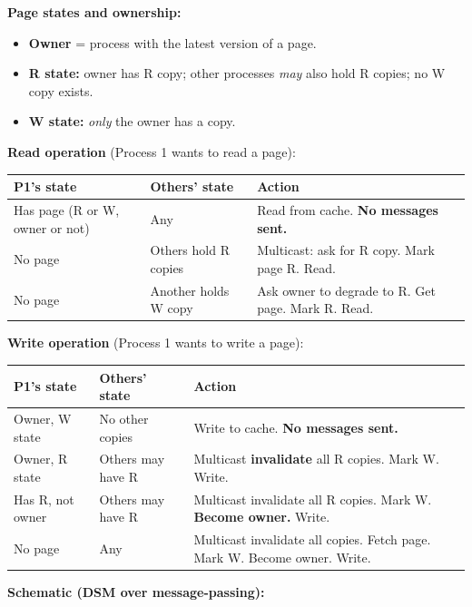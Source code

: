 \documentclass[12pt,a4paper]{article}
\begin{document}
\textbf{Page states and ownership:}
\begin{itemize}[noitemsep]
  \item \textbf{Owner} = process with the latest version of a page.
  \item \textbf{R state:} owner has R copy; other processes \emph{may} also hold R copies; no W copy exists.
  \item \textbf{W state:} \emph{only} the owner has a copy.
\end{itemize}

\textbf{Read operation} (Process 1 wants to read a page):

\begin{center}
\begin{tabular}{@{}lll@{}}
\toprule
P1's state & Others' state & Action \\
\midrule
Has page (R or W, owner or not) & Any & Read from cache. \textbf{No messages sent.} \\
No page & Others hold R copies & Multicast: ask for R copy. Mark page R. Read. \\
No page & Another holds W copy & Ask owner to degrade to R. Get page. Mark R. Read. \\
\bottomrule
\end{tabular}
\end{center}

\textbf{Write operation} (Process 1 wants to write a page):

\begin{center}
\begin{tabular}{@{}lll@{}}
\toprule
P1's state & Others' state & Action \\
\midrule
Owner, W state & No other copies & Write to cache. \textbf{No messages sent.} \\
Owner, R state & Others may have R & Multicast \textbf{invalidate} all R copies. Mark W. Write. \\
Has R, not owner & Others may have R & Multicast invalidate all R copies. Mark W. \textbf{Become owner.} Write. \\
No page & Any & Multicast invalidate all copies. Fetch page. Mark W. Become owner. Write. \\
\bottomrule
\end{tabular}
\end{center}

\textbf{Schematic (DSM over message-passing):}
\end{document}
